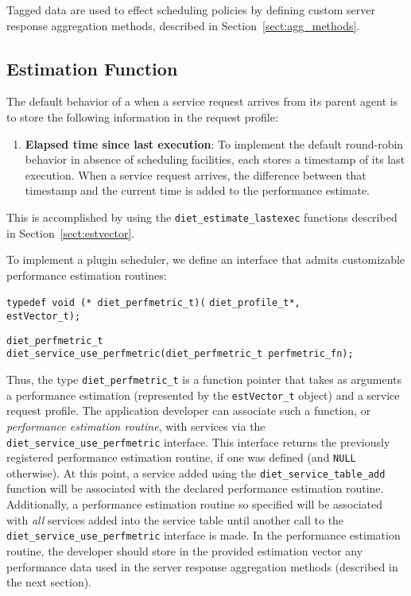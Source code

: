 Tagged data are used to effect scheduling policies by defining custom server
response aggregation methods, described in Section~\ref{sect:agg_methods}.

\subsection{Estimation Function}\label{sect:est_fn}

The default behavior of a {\sed} when a service request arrives from its parent
agent is to store the following information in the request profile:
\begin{enumerate}
\item \textbf{Elapsed time since last execution}: To implement the default
  round-robin behavior in absence of scheduling facilities, each {\sed}
  stores a timestamp of its last execution.  When a service request arrives,
  the difference between that timestamp and the current time is added to the
  performance estimate.
\end{enumerate}
This is accomplished by using the \texttt{diet\_estimate\_lastexec} functions
described in Section~\ref{sect:estvector}.

To implement a plugin scheduler, we define an interface that admits
customizable performance estimation routines:
\begin{tabbing}
  \texttt{typedef void (* diet\_perfmetric\_t)(}
    \=\texttt{diet\_profile\_t*,} \\
    \>\texttt{estVector\_t);} \\
\end{tabbing}
\begin{tabbing}
  \texttt{diet\_perfmetric\_t} \\
  \texttt{diet\_service\_use\_perfmetric(diet\_perfmetric\_t perfmetric\_fn);}\\
\end{tabbing}
Thus, the type \texttt{diet\_perfmetric\_t} is a function pointer that takes as
arguments a performance estimation (represented by the \texttt{estVector\_t}
object) and a \diet service request profile.  The application developer can
associate such a function, or \emph{performance estimation routine}, with \diet
services via the \texttt{diet\_service\_use\_perfmetric} interface.  This
interface returns the previously registered performance estimation routine, if
one was defined (and \texttt{NULL} otherwise).  At this point, a service added
using the \texttt{diet\_service\_table\_add} function will be associated with
the declared performance estimation routine.  Additionally, a performance
estimation routine so specified will be associated with \emph{all} services
added into the service table until another call to the
\texttt{diet\_service\_use\_perfmetric} interface is made.  In the performance
estimation routine, the {\sed} developer should store in the provided
estimation vector any performance data used in the server response aggregation
methods (described in the next section).

